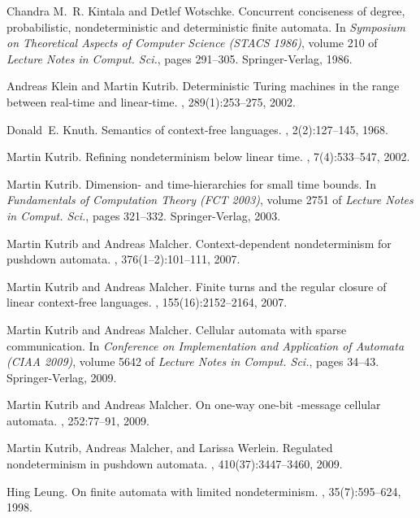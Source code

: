 \documentclass[copyright]{eptcs}
\begin{document}
\begin{thebibliography}{10}
Chandra M.~R. Kintala and Detlef Wotschke.
\newblock Concurrent conciseness of degree, probabilistic, nondeterministic and
  deterministic finite automata.
\newblock In {\em Symposium on Theoretical Aspects of Computer Science ({STACS}
  1986)}, volume 210 of {\em Lecture Notes in Comput. Sci.}, pages 291--305.
  Springer-Verlag, 1986.

Andreas Klein and Martin Kutrib.
\newblock Deterministic {T}uring machines in the range between real-time and
  linear-time.
, 289(1):253--275, 2002.

Donald~E. Knuth.
\newblock Semantics of context-free languages.
, 2(2):127--145, 1968.

Martin Kutrib.
\newblock Refining nondeterminism below linear time.
, 7(4):533--547, 2002.

Martin Kutrib.
\newblock Dimension- and time-hierarchies for small time bounds.
\newblock In {\em Fundamentals of Computation Theory ({FCT} 2003)}, volume 2751
  of {\em Lecture Notes in Comput. Sci.}, pages 321--332. Springer-Verlag,
  2003.

Martin Kutrib and Andreas Malcher.
\newblock Context-dependent nondeterminism for pushdown automata.
, 376(1--2):101--111, 2007.

Martin Kutrib and Andreas Malcher.
\newblock Finite turns and the regular closure of linear context-free
  languages.
, 155(16):2152--2164, 2007.

Martin Kutrib and Andreas Malcher.
\newblock Cellular automata with sparse communication.
\newblock In {\em Conference on Implementation and Application of Automata
  (CIAA 2009)}, volume 5642 of {\em Lecture Notes in Comput. Sci.}, pages
  34--43. Springer-Verlag, 2009.

Martin Kutrib and Andreas Malcher.
\newblock On one-way one-bit -message cellular automata.
, 252:77--91, 2009.

Martin Kutrib, Andreas Malcher, and Larissa Werlein.
\newblock Regulated nondeterminism in pushdown automata.
, 410(37):3447--3460, 2009.

Hing Leung.
\newblock On finite automata with limited nondeterminism.
, 35(7):595--624, 1998.


\end{thebibliography}
\end{document}
